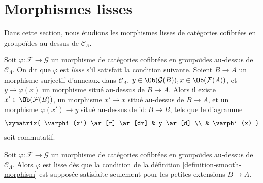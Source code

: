 \section{Morphismes lisses}
\label{section-smooth-morphisms}

\noindent
Dans cette section, nous étudions les morphismes lisses de catégories
cofibrées en groupoïdes au-dessus de $\mathcal{C}_\Lambda$.

\begin{definition}
\label{definition-smooth-morphism}
Soit $\varphi : \mathcal{F} \to \mathcal{G}$ un morphisme de catégories
cofibrées en groupoïdes au-dessus de $\mathcal{C}_\Lambda$. On dit que
$\varphi$ est {\it lisse} s'il satisfait la condition suivante. Soient
$B \to A$ un morphisme surjectif d'anneaux dans $\mathcal{C}_\Lambda$,
$y \in
\Ob(\mathcal{G}(B)), x \in \Ob(\mathcal{F}(A))$, et $y
\to \varphi(x)$ un morphisme situé au-dessus de $B \to A$. Alors il
existe $x' \in \Ob(\mathcal{F}(B))$, un morphisme $x' \to x$ situé au-dessus
de $B \to A$, et un morphisme $\varphi(x') \to y$ situé au-dessus de
$\text{id}: B \to B$, tels que le diagramme
$$
\xymatrix{
\varphi(x') \ar[r] \ar[dr] & y \ar[d] \\
& \varphi(x)
}
$$
soit commutatif.
\end{definition}

\begin{lemma}
\label{lemma-smoothness-small-extensions}
Soit $\varphi : \mathcal{F} \to \mathcal{G}$ un morphisme de catégories
cofibrées en groupoïdes au-dessus de $\mathcal{C}_\Lambda$. Alors $\varphi$
est lisse dès que la condition de la définition
\ref{definition-smooth-morphism} est supposée satisfaite seulement pour les
petites extensions $B \to A$.
\end{lemma}

